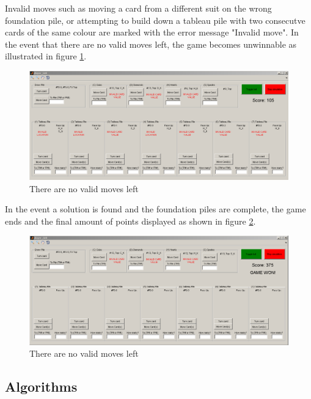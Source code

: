 \documentclass[runningheads,a4paper]{llncs}
\begin{document}
Invalid moves such as moving a card from a different suit on the wrong foundation pile, or attempting to build down a tableau pile with two consecutve cards of the same colour are marked with the error message "Invalid move".
In the event that there are no valid moves left, the game becomes unwinnable as illustrated in figure \ref{fig:nowin}.
\begin{figure}
	\begin{center}
		\includegraphics[width=\textwidth]{images/gameUnwinnable}
		\caption{There are no valid moves left}
		\label{fig:nowin}
	\end{center}
\end{figure}
\newline

In the event a solution is found and the foundation piles are complete, the game ends and the final amount of points displayed as shown in figure \ref{fig:win}.
\begin{figure}
	\begin{center}
		\includegraphics[width=\textwidth]{images/gameWonWScore}
		\caption{There are no valid moves left}
		\label{fig:win}
	\end{center}
\end{figure}

\label{sec:3_gui}
\clearpage
\subsection{Algorithms}
\end{document}
